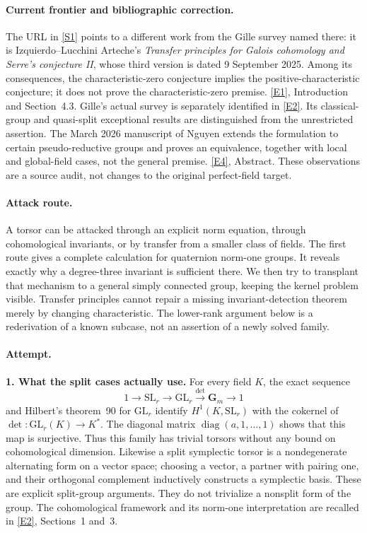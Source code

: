 \documentclass[11pt,a4paper]{article}
\newcommand{\sref}[2]{\hyperlink{source:#1:#2}{[S#2]}}
\newcommand{\eref}[2]{\hyperlink{extra:#1:#2}{[E#2]}}
\numberwithin{equation}{section}
\begin{document}
\paragraph{Current frontier and bibliographic correction.}
The URL in \sref{statement}{1} points to a different work from the Gille survey
named there: it is Izquierdo--Lucchini Arteche's \emph{Transfer principles
for Galois cohomology and Serre's conjecture II}, whose third version is
dated 9 September 2025. Among its consequences, the characteristic-zero
conjecture implies the positive-characteristic conjecture; it does not
prove the characteristic-zero premise. \eref{statement}{1}, Introduction and
Section~4.3. Gille's actual survey is separately identified in
\eref{statement}{2}. Its classical-group and quasi-split exceptional results
are distinguished from the unrestricted assertion.
The March 2026 manuscript of Nguyen extends the formulation to certain
pseudo-reductive groups and proves an equivalence, together with local
and global-field cases, not the general premise. \eref{statement}{4}, Abstract.
These observations are a source audit, not changes to the original
perfect-field target.

\paragraph{Attack route.}
A torsor can be attacked through an explicit norm equation, through
cohomological invariants, or by transfer from a smaller class of fields.
The first route gives a complete calculation for quaternion norm-one
groups. It reveals exactly why a degree-three invariant is sufficient
there. We then try to transplant that mechanism to a general simply
connected group, keeping the kernel problem visible. Transfer principles
cannot repair a missing invariant-detection theorem merely by changing
characteristic. The lower-rank argument below is a rederivation of a
known subcase, not an assertion of a newly solved family.

\paragraph{Attempt.}
\textbf{1. What the split cases actually use.}
For every field $K$, the exact sequence
\[
 1\longrightarrow\mathrm{SL}_r\longrightarrow\mathrm{GL}_r
       \xrightarrow{\det}\mathbf G_m\longrightarrow1
\]
and Hilbert's theorem~90 for $\mathrm{GL}_r$ identify
$H^1(K,\mathrm{SL}_r)$ with the cokernel of
$\det:\mathrm{GL}_r(K)\to K^*$. The diagonal matrix
$\operatorname{diag}(a,1,\ldots,1)$ shows that this map is surjective.
Thus this family has trivial torsors without any bound on cohomological
dimension. Likewise a split symplectic torsor is a nondegenerate
alternating form on a vector space; choosing a vector, a partner with
pairing one, and their orthogonal complement inductively constructs a
symplectic basis. These are explicit split-group arguments. They do
not trivialize a nonsplit form of the group. The cohomological framework
and its norm-one interpretation are recalled in \eref{statement}{2}, Sections~1
and~3.
\end{document}
